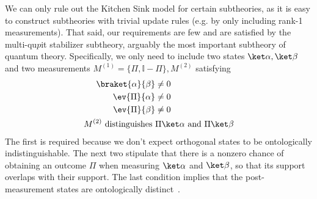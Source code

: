 \documentclass[%
 reprint,
superscriptaddress,
nofootinbib,
 amsmath,amssymb,
 prx, 
 accepted=2019-09-27,
]{quantumarticle}
\newcommand{\Id}{\mathbb{I}}
\begin{document}
We can only rule out the Kitchen Sink model for certain subtheories,
as it is easy to construct subtheories with trivial update rules
(e.g. by only including rank-1 measurements). That said, our
requirements are few and are satisfied by the multi-qu$p$it stabilizer
subtheory, arguably the most important subtheory of quantum theory.
Specifically, we only need to include two states
$\ket\alpha,\ket\beta$ and two measurements $M^{(1)}=\{\Pi,\Id-\Pi\},M^{(2)}$
satisfying
\begin{align}
  \braket{\alpha}{\beta} &\neq 0\label{eq:4}\\ 
  \ev{\Pi}{\alpha} &\neq 0\label{eq:5}\\
  \ev{\Pi}{\beta} &\neq 0\label{eq:8}\\
  M^{(2)}\text{ distinguishes }&\Pi\ket\alpha\text{ and }\Pi\ket\beta\label{eq:10}
\end{align}
The first is required because we don't expect orthogonal states to be
ontologically indistinguishable. The next two stipulate that there is
a nonzero chance of obtaining an outcome $\Pi$ when measuring
$\ket\alpha$ and $\ket\beta$, so that its support overlaps with their
support. The last condition implies that the post-measurement states
are ontologically distinct~\cite{Leiferquantumstatereal2014}.
\end{document}
